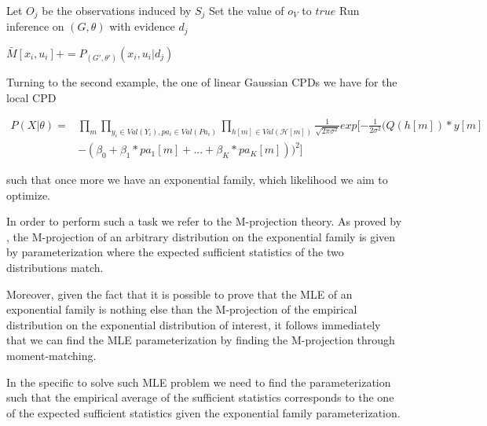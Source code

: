 \documentclass[11pt]{article}
\begin{document}
\begin{article}
\begin{algorithm*}[h!]
\begin{multicols}{2}
\begin{algorithmic}[1]

    \State Let $O_j$ be the observations induced by $S_j$
      \State Set the value of $o_V$ to $true$
    \EndFor
    \State Run inference on $(G,\theta)$ with evidence $d_{j}$
    
        \State $\bar{M}[x_{i},u_{i}] \mathrel{{+}{=}} P_{(G',\theta')}(x_{i},u_{i}|d_{j})$
    
      \EndFor
    \EndFor
\EndFor
\EndFunction
\end{algorithmic}
\end{multicols}
\end{algorithm*}


Turning to the second example, the one of linear Gaussian CPDs we
have for the local CPD

\begin{align} \label{eq:like-gaussian-cpd}
P(X|\theta) = &\prod_m \prod_{y_i \in Val(Y_i), pa_i \in Val(Pa_i)} \prod_{h[m] \in Val(\mathscr{H}[m])} \frac{1}{\sqrt{2\pi\sigma^2}} exp[-\frac{1}{2\sigma^2} (Q(h[m]) * y[m]  \\
            & - (\beta_0 + \beta_1 * pa_1[m] + ... + \beta_K * pa_K[m]))^2]  \nonumber
\end{align}

such that once more we have an exponential family, which likelihood
we aim to optimize.

In order to perform such a task we refer to the M-projection
theory. As proved by \cite{koller2009probabilistic}, the M-projection
of an arbitrary distribution on the exponential family is given by
parameterization where the expected sufficient statistics of the
two distributions match.

Moreover, given the fact that it is possible to prove that the MLE
of an exponential family is nothing else than the M-projection of
the empirical distribution on the exponential distribution of
interest, it follows immediately that we can find the MLE
parameterization by finding the M-projection through
moment-matching.

In the specific to solve such MLE problem we need to find the
parameterization such that the empirical average of the sufficient
statistics corresponds to the one of the expected sufficient
statistics given the exponential family parameterization.


\end{article}
\end{document}
